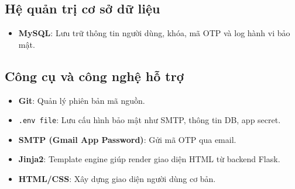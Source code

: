 \subsection{Hệ quản trị cơ sở dữ liệu}
\begin{itemize}
    \item \textbf{MySQL}: Lưu trữ thông tin người dùng, khóa, mã OTP và log hành vi bảo mật.
\end{itemize}

\subsection{Công cụ và công nghệ hỗ trợ}
\begin{itemize}
    \item \textbf{Git}: Quản lý phiên bản mã nguồn.
    \item \texttt{.env file}: Lưu cấu hình bảo mật như SMTP, thông tin DB, app secret.
    \item \textbf{SMTP (Gmail App Password)}: Gửi mã OTP qua email.
    \item \textbf{Jinja2}: Template engine giúp render giao diện HTML từ backend Flask.
    \item \textbf{HTML/CSS}: Xây dựng giao diện người dùng cơ bản.
\end{itemize}
